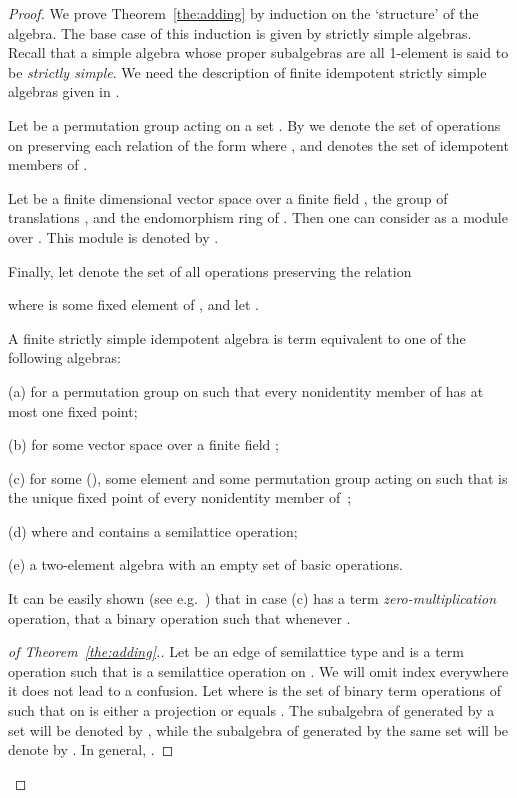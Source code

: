 \documentclass[11pt]{article}
\begin{document}
\begin{proof}
We prove Theorem~\ref{the:adding} by induction on the `structure' of the algebra.
The base case of this induction is given by strictly simple algebras.
Recall that a simple algebra whose proper subalgebras are all
1-element is said to be {\em strictly simple}. We need the description
of finite idempotent strictly simple algebras given in
\cite{Szendrei90:surjective}. 

Let  be a permutation group acting on a set . By  we
denote the set of operations on  preserving each
relation of the form  where
, and  denotes the set of idempotent
members of .

Let  be a finite dimensional
vector space over a finite field ,   the group of
translations 
, and  the endomorphism ring
of . Then one can consider  as a module over
. This module is denoted by .

Finally, let  denote the set of all
operations preserving the relation

where  is some fixed element of ,
and let .
\begin{theorem} \label{str}
A finite strictly simple idempotent algebra  is 
term equivalent to one of the following algebras:

(a)  for a permutation group  on 
such that every nonidentity member of  has at most one
fixed point;

(b)  for
some vector space  over a finite field ;

(c)  for some  (),
some element  and some permutation group  acting on 
such that  is the unique fixed point of every nonidentity
member of~;

(d)  where  and  contains a semilattice operation;

(e) a two-element algebra with an empty set of basic operations.
\end{theorem}
It can be easily shown (see e.g.\ \cite{Bulatov05:classifying}) that
in case (c)  has a term {\em zero-multiplication} operation, that
a binary operation  such that  whenever .

\begin{proof}[of Theorem~\ref{the:adding}.]
Let  be an edge of semilattice type and  is a term operation
such that  is a semilattice operation on
. We will omit index
 everywhere it does not lead to a confusion. Let
 where  is the set of binary term operations  of
 such that  on  is either a projection or
equals . The subalgebra of  generated by a set
 will be denoted by , while the subalgebra of
 generated by the same set will be denote by . In
general, .
\medskip


\end{proof}
\end{proof}
\end{document}
